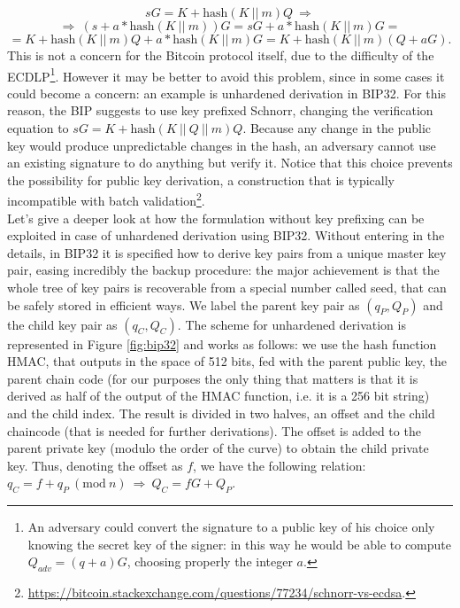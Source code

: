 $$sG = K + \text{hash}(K \ || \ m)Q \ \Longrightarrow$$
$$\Longrightarrow \ (s + a*\text{hash}(K \ || \ m))G = sG + a*\text{hash}(K \ || \ m)G =$$
$$= K + \text{hash}(K \ || \ m)Q + a*\text{hash}(K \ || \ m)G = K + \text{hash}(K \ || \ m)(Q + aG).$$
This is not a concern for the Bitcoin protocol itself, due to the difficulty of the ECDLP\footnote{An adversary could convert the signature to a public key of his choice only knowing the secret key of the signer: in this way he would be able to compute $Q_{adv} = (q + a)G$, choosing properly the integer $a$.}. However it may be better to avoid this problem, since in some cases it could become a concern: an example is unhardened derivation in BIP32. For this reason, the BIP suggests to use key prefixed Schnorr, changing the verification equation to $sG = K + \text{hash}(K \ || \ Q \ || \ m)Q$. Because any change in the public key would produce unpredictable changes in the hash, an adversary cannot use an existing signature to do anything but verify it. Notice that this choice prevents the possibility for public key derivation, a construction that is typically incompatible with batch validation\footnote{\url{https://bitcoin.stackexchange.com/questions/77234/schnorr-vs-ecdsa}.}.
\\
Let's give a deeper look at how the formulation without key prefixing can be exploited in case of unhardened derivation using BIP32. Without entering in the details, in BIP32 it is specified how to derive key pairs from a unique master key pair, easing incredibly the backup procedure: the major achievement is that the whole tree of key pairs is recoverable from a special number called seed, that can be safely stored in efficient ways. We label the parent key pair as $(q_P, Q_P)$ and the child key pair as $(q_C, Q_C)$. The scheme for unhardened derivation is represented in Figure \ref{fig:bip32} and works as follows: we use the hash function HMAC, that outputs in the space of 512 bits, fed with the parent public key, the parent chain code (for our purposes the only thing that matters is that it is derived as half of the output of the HMAC function, i.e. it is a 256 bit string) and the child index. The result is divided in two halves, an offset and the child chaincode (that is needed for further derivations). The offset is added to the parent private key (modulo the order of the curve) to obtain the child private key. Thus, denoting the offset as $f$, we have the following relation: $q_C = f + q_P \ (\text{mod} \ n) \ \Longrightarrow \ Q_C = fG + Q_P$.

